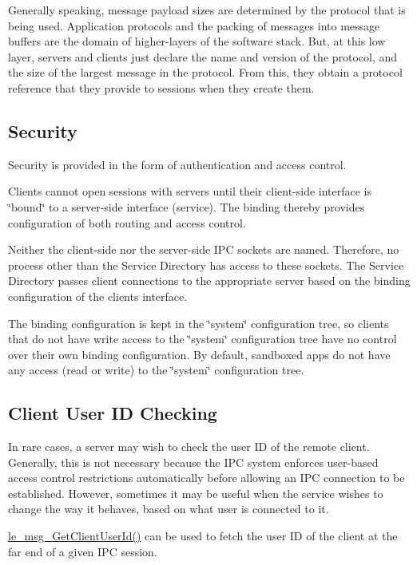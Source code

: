 Generally speaking, message payload sizes are determined by the protocol that is being used. Application protocols and the packing of messages into message buffers are the domain of higher-\/layers of the software stack. But, at this low layer, servers and clients just declare the name and version of the protocol, and the size of the largest message in the protocol. From this, they obtain a protocol reference that they provide to sessions when they create them.\hypertarget{c_messaging_c_messagingSecurity}{}\subsection{Security}\label{c_messaging_c_messagingSecurity}
Security is provided in the form of authentication and access control.

Clients cannot open sessions with servers until their client-\/side interface is \char`\"{}bound\char`\"{} to a server-\/side interface (service). The binding thereby provides configuration of both routing and access control.

Neither the client-\/side nor the server-\/side I\+P\+C sockets are named. Therefore, no process other than the Service Directory has access to these sockets. The Service Directory passes client connections to the appropriate server based on the binding configuration of the client\textquotesingle{}s interface.

The binding configuration is kept in the \char`\"{}system\char`\"{} configuration tree, so clients that do not have write access to the \char`\"{}system\char`\"{} configuration tree have no control over their own binding configuration. By default, sandboxed apps do not have any access (read or write) to the \char`\"{}system\char`\"{} configuration tree.\hypertarget{c_messaging_c_messagingClientUserIdChecking}{}\subsection{Client User I\+D Checking}\label{c_messaging_c_messagingClientUserIdChecking}
In rare cases, a server may wish to check the user I\+D of the remote client. Generally, this is not necessary because the I\+P\+C system enforces user-\/based access control restrictions automatically before allowing an I\+P\+C connection to be established. However, sometimes it may be useful when the service wishes to change the way it behaves, based on what user is connected to it.

\hyperlink{le__messaging_8h_a8c04f9cad0a768b4922a9987df84b65f}{le\+\_\+msg\+\_\+\+Get\+Client\+User\+Id()} can be used to fetch the user I\+D of the client at the far end of a given I\+P\+C session.


